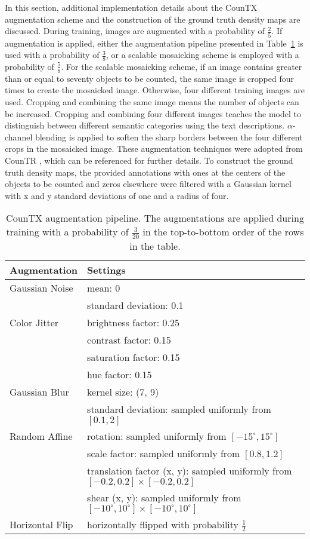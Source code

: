 \documentclass{bmvc2k}
\begin{document}
In this section, additional implementation details about the CounTX augmentation scheme and the construction of the ground truth density maps are discussed. During training, images are augmented with a probability of $\frac{2}{5}$. If augmentation is applied, either the augmentation pipeline presented in Table~\ref{aug} is used with a probability of $\frac{3}{8}$, or a scalable mosaicking scheme is employed with a probability of $\frac{5}{8}$. For the scalable mosaicking scheme, if an image contains greater than or equal to seventy objects to be counted, the same image is cropped four times to create the mosaicked image. Otherwise, four different training images are used. Cropping and combining the same image means the number of objects can be increased. Cropping and combining four different images teaches the model to distinguish between different semantic categories using the text descriptions. $\alpha$-channel blending is applied to soften the sharp borders between the four different crops in the mosaicked image. These augmentation techniques were adopted from CounTR \cite{Liu2022CounTRTG}, which can be referenced for further details. To construct the ground truth density maps, the provided annotations with ones at the centers of the objects to be counted and zeros elsewhere were filtered with a Gaussian kernel with x and y standard deviations of one and a radius of four.
\begin{table}[h!]
\scriptsize
\centering
\begin{tabular}{|l|l|} 
  \hline
  \textbf{Augmentation} & \textbf{Settings} \\
   \hline
   Gaussian Noise & mean: 0\\ & standard deviation: 0.1 \\
   \hline
   Color Jitter & brightness factor: 0.25 \\ & contrast factor: 0.15 \\ & saturation factor: 0.15 \\ & hue factor: 0.15\\
  \hline
  Gaussian Blur & kernel size: (7, 9) \\ & standard deviation: sampled uniformly from $[0.1, 2]$\\
  \hline
  Random Affine & rotation: sampled uniformly from $[-15^{\circ}, 15^{\circ}]$\\ & scale factor: sampled uniformly from $[0.8, 1.2]$\\ & translation factor (x, y): sampled uniformly from $[-0.2, 0.2] \times [-0.2, 0.2]$\\ & shear (x, y): sampled uniformly from $[-10^{\circ}, 10^{\circ}] \times [-10^{\circ}, 10^{\circ}]$\\
  \hline
  Horizontal Flip & horizontally flipped with probability $\frac{1}{2}$\\
  \hline
 \end{tabular}
 \vspace{1mm}
 \caption{\label{aug} CounTX augmentation pipeline. The augmentations are applied during training with a probability of $\frac{3}{20}$ in the top-to-bottom order of the rows in the table.}
 \end{table}
 
\end{document}
